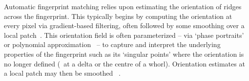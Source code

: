 \label{s:review_orientation_fingerprints}
%
Automatic fingerprint matching relies upon estimating the orientation of ridges across the fingerprint. This typically begins by computing the orientation at every pixel via gradient-based filtering, often followed by some smoothing over a local patch~\cite{Bazen_Gerez_TPAMI02,Mei_etal_IVC09}. This orientation field is often parameterized -- via `phase portraits'~\cite{Li_etal_PR06} or polynomial approximation~\cite{Gu_etal_PR04} -- to capture and interpret the underlying properties of the fingerprint such as its `singular points' where the orientation is no longer defined (\eg~at a delta or the centre of a whorl). Orientation estimates at a local patch may then be smoothed ~\cite{Kass_Witkin_CVGIP87,Rao_Jain_TPAMI92,Perona_TIP98}.